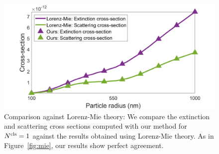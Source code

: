\begin{figure}
    \centering
    \setlength{\resLen}{3in}
    \includegraphics[width=\resLen]{images/pfunc/CsCt.png} 
    \caption{
        Comparison against Lorenz-Mie theory: We compare the extinction and scattering cross sections computed with our method for ${N^\text{cls}}=1$ against the results obtained using Lorenz-Mie theory. As in Figure~\ref{fig:mie}, our results show perfect agreement. 
        \label{fig:mie2}
    }
\end{figure}
